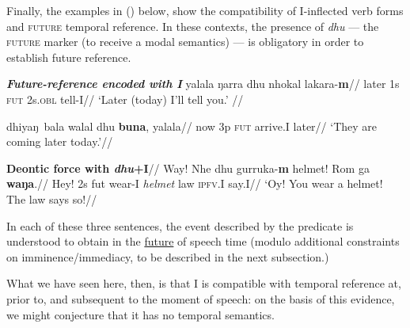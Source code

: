 \xe


Finally, the examples in () below, show the compatibility of \gls{I}-inflected verb forms and \textsc{future} temporal reference.  In these contexts, the presence of \textit{dhu} --- the \textsc{future} marker (to receive a modal semantics) --- is obligatory in order to establish future reference. 

\pex {} \textit{\textbf{Future-reference encoded with \gls{I}}}
\a{}\begingl\gla yalala ŋarra dhu nhokal lakara-\textbf{m}//
\glb later 1s \textsc{fut} 2s\textsc{.obl} tell-\gls{I}//
\glft `Later (today) I'll tell you.' //\endgl

\a{}\begingl \gla dhiyaŋ~bala walal dhu \textbf{buna}, yalala//
\glb now 3p \textsc{fut} arrive.\gls{I} later//
\glft`They are coming later today.'//\endgl


\a\begingl\glpreamble \textbf{Deontic force with \textit{dhu}+\gls{I}}//
\gla Way! Nhe dhu gurruka-\textbf{m} helmet! Rom ga \textbf{waŋa}.//
\glb Hey! 2s \gls{fut} wear-\gls{I} \textit{helmet} law \textsc{ipfv.\gls{I}}  say.\gls{I}//
\glft`Oy! You wear a helmet! The law says so!\trailingcitation{[AW~20170730]}//\endgl


\xe


\noindent In each of these three sentences, the event described by the predicate is understood to obtain in the \underline{future} of speech time (modulo additional constraints on imminence/immediacy, to be described in the next subsection.)

What we have seen here, then, is that \gls{I} is compatible with temporal reference at, prior to, and subsequent to the moment of speech: on the basis of this evidence, we might conjecture that it has no temporal semantics. %

